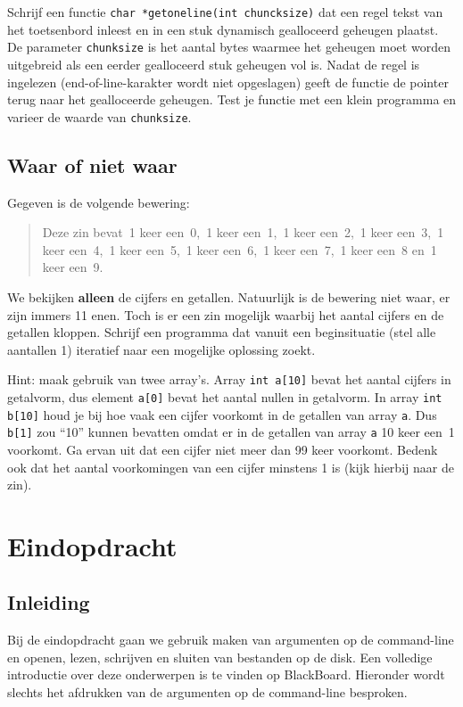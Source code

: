 \documentclass[a4paper,10pt,fleqn,twoside]{article}
\begin{document}
Schrijf een functie \lstinline|char *getoneline(int chuncksize)| dat een regel tekst van het toetsenbord inleest en in een stuk dynamisch gealloceerd geheugen plaatst. De parameter \lstinline|chunksize| is het aantal bytes waarmee het geheugen moet worden uitgebreid als een eerder gealloceerd stuk geheugen vol is. Nadat de regel is ingelezen (end-of-line-karakter wordt niet opgeslagen) geeft de functie de pointer terug naar het gealloceerde geheugen. Test je functie met een klein programma en varieer de waarde van \lstinline|chunksize|.

\subsection{Waar of niet waar}
Gegeven is de volgende bewering:
\begin{quote}
Deze zin bevat~1 keer een~0,~1 keer een~1,~1 keer een~2,~1 keer een~3,~1 keer een~4,~1 keer een~5,~1 keer een~6,~1 keer een~7,~1 keer een~8 en~1 keer een~9.
\end{quote}

We bekijken \textbf{alleen} de cijfers en getallen. Natuurlijk is de bewering niet waar, er zijn immers 11 enen. Toch is er een zin mogelijk waarbij het aantal cijfers en de getallen kloppen. Schrijf een programma dat vanuit een beginsituatie (stel alle aantallen 1) iteratief naar een mogelijke oplossing zoekt.

Hint: maak gebruik van twee array's. Array \lstinline|int a[10]| bevat het aantal cijfers in getalvorm, dus element \lstinline|a[0]| bevat het aantal nullen in getalvorm. In array \lstinline|int b[10]| houd je bij hoe vaak een cijfer voorkomt in de getallen van array \lstinline|a|. Dus \lstinline|b[1]| zou ``10'' kunnen bevatten omdat er in de getallen van array \lstinline|a| 10 keer een~1 voorkomt. Ga ervan uit dat een cijfer niet meer dan 99 keer voorkomt. Bedenk ook dat het aantal voorkomingen van een cijfer minstens 1 is (kijk hierbij naar de zin).

\section{Eindopdracht}

\subsection{Inleiding}
Bij de eindopdracht gaan we gebruik maken van argumenten op de command-line en openen, lezen, schrijven en sluiten van bestanden op de disk. Een volledige introductie over deze onderwerpen is te vinden op BlackBoard. Hieronder wordt slechts het afdrukken van de argumenten op de command-line besproken.
\end{document}
